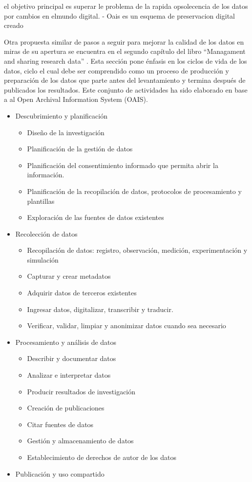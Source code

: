 \documentclass[
  14pt,
]{book}
\providecommand{\tightlist}{%
  \setlength{\itemsep}{0pt}\setlength{\parskip}{0pt}}
\begin{document}
el objetivo principal es superar le problema de la rapida opsolecencia de los datos por cambios en elmundo digital.
- Oais es un esquema de preservacion digital creado

Otra propuesta similar de pasos a seguir para mejorar la calidad de los datos en miras de su apertura se encuentra en el segundo capítulo del libro ``Managament and sharing research data'' \citep{corti_Managing_2019}. Esta sección pone énfasis en los ciclos de vida de los datos, ciclo el cual debe ser comprendido como un proceso de producción y preparación de los datos que parte antes del levantamiento y termina después de publicados los resultados. Este conjunto de actividades ha sido elaborado en base a al Open Archival Information System (OAIS).

\begin{itemize}
\tightlist
\item
  Descubrimiento y planificación

  \begin{itemize}
  \tightlist
  \item
    Diseño de la investigación
  \item
    Planificación de la gestión de datos
  \item
    Planificación del consentimiento informado que permita abrir la información.
  \item
    Planificación de la recopilación de datos, protocolos de procesamiento y plantillas
  \item
    Exploración de las fuentes de datos existentes
  \end{itemize}
\item
  Recolección de datos

  \begin{itemize}
  \tightlist
  \item
    Recopilación de datos: registro, observación, medición, experimentación y simulación
  \item
    Capturar y crear metadatos
  \item
    Adquirir datos de terceros existentes
  \item
    Ingresar datos, digitalizar, transcribir y traducir.
  \item
    Verificar, validar, limpiar y anonimizar datos cuando sea necesario
  \end{itemize}
\item
  Procesamiento y análisis de datos

  \begin{itemize}
  \tightlist
  \item
    Describir y documentar datos
  \item
    Analizar e interpretar datos
  \item
    Producir resultados de investigación
  \item
    Creación de publicaciones
  \item
    Citar fuentes de datos
  \item
    Gestión y almacenamiento de datos
  \item
    Establecimiento de derechos de autor de los datos
  \end{itemize}
\item
  Publicación y uso compartido


\end{itemize}
\end{document}
